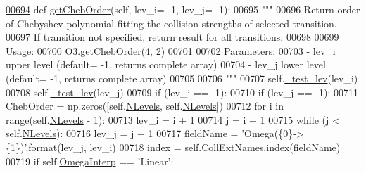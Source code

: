 \begin{DoxyCode}
\hypertarget{classpyneb_1_1core_1_1pynebcore_1_1___coll_data_fits_l00694}{}\hyperlink{classpyneb_1_1core_1_1pynebcore_1_1___coll_data_fits_ac2e555f92570ed4df42926d0c415ac4c}{00694}     \textcolor{keyword}{def }\hyperlink{classpyneb_1_1core_1_1pynebcore_1_1___coll_data_fits_ac2e555f92570ed4df42926d0c415ac4c}{getChebOrder}(self, lev\_i= -1, lev\_j= -1):
00695         \textcolor{stringliteral}{"""}
00696 \textcolor{stringliteral}{        Return order of Chebyshev polynomial fitting the collision strengths of selected transition.}
00697 \textcolor{stringliteral}{        If transition not specified, return result for all transitions.}
00698 \textcolor{stringliteral}{        }
00699 \textcolor{stringliteral}{        Usage:}
00700 \textcolor{stringliteral}{            O3.getChebOrder(4, 2)}
00701 \textcolor{stringliteral}{        }
00702 \textcolor{stringliteral}{        Parameters:}
00703 \textcolor{stringliteral}{            - lev\_i  upper level (default= -1, returns complete array)}
00704 \textcolor{stringliteral}{            - lev\_j  lower level (default= -1, returns complete array)}
00705 \textcolor{stringliteral}{}
00706 \textcolor{stringliteral}{        """}
00707         self.\hyperlink{classpyneb_1_1core_1_1pynebcore_1_1___coll_data_fits_a7bc932cc0743068d924a2ac51af0b4d4}{\_test\_lev}(lev\_i)
00708         self.\hyperlink{classpyneb_1_1core_1_1pynebcore_1_1___coll_data_fits_a7bc932cc0743068d924a2ac51af0b4d4}{\_test\_lev}(lev\_j)
00709         \textcolor{keywordflow}{if} (lev\_i == -1):
00710             \textcolor{keywordflow}{if} (lev\_j == -1):
00711                 ChebOrder = np.zeros([self.\hyperlink{classpyneb_1_1core_1_1pynebcore_1_1___coll_data_fits_a64b97a86b4dfb53e4cba3ce8ac0fdf00}{NLevels}, self.\hyperlink{classpyneb_1_1core_1_1pynebcore_1_1___coll_data_fits_a64b97a86b4dfb53e4cba3ce8ac0fdf00}{NLevels}])
00712                 \textcolor{keywordflow}{for} i \textcolor{keywordflow}{in} range(self.\hyperlink{classpyneb_1_1core_1_1pynebcore_1_1___coll_data_fits_a64b97a86b4dfb53e4cba3ce8ac0fdf00}{NLevels} - 1):
00713                     lev\_i = i + 1
00714                     j = i + 1
00715                     \textcolor{keywordflow}{while} (j < self.\hyperlink{classpyneb_1_1core_1_1pynebcore_1_1___coll_data_fits_a64b97a86b4dfb53e4cba3ce8ac0fdf00}{NLevels}):
00716                         lev\_j = j + 1
00717                         fieldName = \textcolor{stringliteral}{'Omega(\{0\}->\{1\})'}.format(lev\_j, lev\_i)
00718                         index = self.CollExtNames.index(fieldName)
00719                         \textcolor{keywordflow}{if} self.\hyperlink{classpyneb_1_1core_1_1pynebcore_1_1___coll_data_fits_a3e15df449393d23d1ac760671b5828cc}{OmegaInterp} == \textcolor{stringliteral}{'Linear'}:

\end{DoxyCode}
